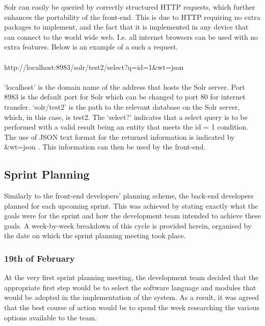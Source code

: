 \documentclass[journal]{IEEEtran}
\begin{document}
\hfill \break Solr can easily be queried by correctly structured HTTP requests, which further enhances the portability of the front-end. This is due to HTTP requiring no extra packages to implement, and the fact that it is implemented in any device that can connect to the world wide web. I.e. all internet browsers can be used with no extra features. Below is an example of a such a request. \\\\ http://localhost:8983/solr/test2/select?q=id=1\&wt=json \\\\
`localhost' is the domain name of the address that hosts the Solr server. Port 8983 is the default port for Solr which can be changed to port 80 for internet transfer. `solr/test2' is the path to the relevant database on the Solr server, which, in this case, is test2. The `select?' indicates that a select query is to be performed with a valid result being an entity that meets the id = 1 condition. The use of JSON text format for the returned information is indicated by \&wt=json \cite{solrguide}. This information can then be used by the front-end.


\subsection{Sprint Planning}

Similarly to the front-end developers' planning scheme, the back-end developers planned for each upcoming sprint. This was achieved by stating exactly what the goals were for the sprint and how the development team intended to achieve these goals. A week-by-week breakdown of this cycle is provided herein, organised by the date on which the sprint planning meeting took place. \\

\subsubsection{19th of February}

At the very first sprint planning meeting, the development team decided that the appropriate first step would be to select the software language and modules that would be adopted in the implementation of the system. As a result, it was agreed that the best course of action would be to spend the week researching the various options available to the team.
\\
\end{document}
